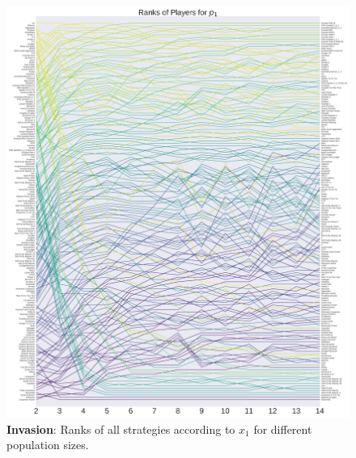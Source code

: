 \documentclass[10pt,letterpaper]{article}
\begin{document}
\begin{figure}[!hbtp]
    \centering
    \includegraphics[width=\columnwidth]{./average_rank_vs_population_size_invade.pdf}
    \caption{\textbf{Invasion}: Ranks of all strategies according to \(x_1\) for different population sizes.}
    \label{fig:ranks_v_size_invade}
\end{figure}
\end{document}
